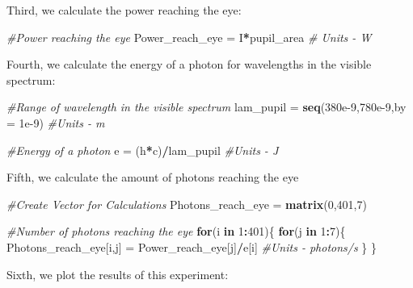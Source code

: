 \documentclass[]{article}
\newenvironment{Shaded}{\begin{snugshade}}{\end{snugshade}}
\newcommand{\KeywordTok}[1]{\textcolor[rgb]{0.13,0.29,0.53}{\textbf{#1}}}
\newcommand{\DataTypeTok}[1]{\textcolor[rgb]{0.13,0.29,0.53}{#1}}
\newcommand{\DecValTok}[1]{\textcolor[rgb]{0.00,0.00,0.81}{#1}}
\newcommand{\FloatTok}[1]{\textcolor[rgb]{0.00,0.00,0.81}{#1}}
\newcommand{\StringTok}[1]{\textcolor[rgb]{0.31,0.60,0.02}{#1}}
\newcommand{\CommentTok}[1]{\textcolor[rgb]{0.56,0.35,0.01}{\textit{#1}}}
\newcommand{\ControlFlowTok}[1]{\textcolor[rgb]{0.13,0.29,0.53}{\textbf{#1}}}
\newcommand{\OperatorTok}[1]{\textcolor[rgb]{0.81,0.36,0.00}{\textbf{#1}}}
\newcommand{\NormalTok}[1]{#1}
\begin{document}
Third, we calculate the power reaching the eye:

\begin{Shaded}
\begin{Highlighting}[]
\CommentTok{#Power reaching the eye}
\NormalTok{Power_reach_eye =}\StringTok{ }\NormalTok{I}\OperatorTok{*}\NormalTok{pupil_area }\CommentTok{# Units - W}
\end{Highlighting}
\end{Shaded}

Fourth, we calculate the energy of a photon for wavelengths in the
visible spectrum:

\begin{Shaded}
\begin{Highlighting}[]
\CommentTok{#Range of wavelength in the visible spectrum}
\NormalTok{lam_pupil =}\StringTok{ }\KeywordTok{seq}\NormalTok{(}\FloatTok{380e-9}\NormalTok{,}\FloatTok{780e-9}\NormalTok{,}\DataTypeTok{by =} \FloatTok{1e-9}\NormalTok{) }\CommentTok{#Units - m}

\CommentTok{#Energy of a photon}
\NormalTok{e =}\StringTok{ }\NormalTok{(h}\OperatorTok{*}\NormalTok{c)}\OperatorTok{/}\NormalTok{lam_pupil }\CommentTok{#Units - J}
\end{Highlighting}
\end{Shaded}

Fifth, we calculate the amount of photons reaching the eye

\begin{Shaded}
\begin{Highlighting}[]
\CommentTok{#Create Vector for Calculations}
\NormalTok{Photons_reach_eye =}\StringTok{ }\KeywordTok{matrix}\NormalTok{(}\DecValTok{0}\NormalTok{,}\DecValTok{401}\NormalTok{,}\DecValTok{7}\NormalTok{)}

\CommentTok{#Number of photons reaching the eye}
\ControlFlowTok{for}\NormalTok{(i }\ControlFlowTok{in} \DecValTok{1}\OperatorTok{:}\DecValTok{401}\NormalTok{)\{}
  \ControlFlowTok{for}\NormalTok{(j }\ControlFlowTok{in} \DecValTok{1}\OperatorTok{:}\DecValTok{7}\NormalTok{)\{}
\NormalTok{    Photons_reach_eye[i,j] =}\StringTok{ }\NormalTok{Power_reach_eye[j]}\OperatorTok{/}\NormalTok{e[i] }\CommentTok{#Units - photons/s}
\NormalTok{  \}}
\NormalTok{\}}
\end{Highlighting}
\end{Shaded}

Sixth, we plot the results of this experiment:
\end{document}
